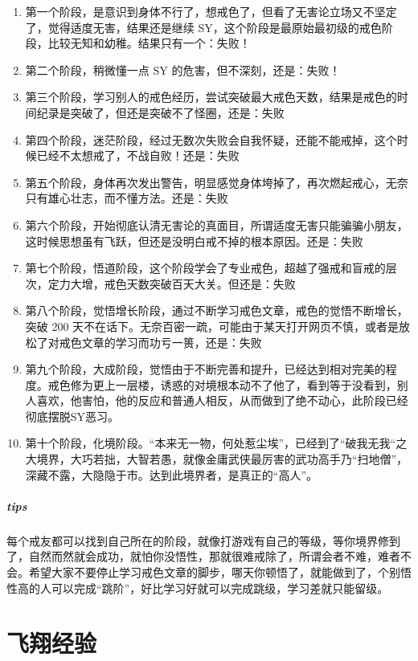 \documentclass[fontset=founder]{ctexart}
\begin{document}
\begin{enumerate}
    \item 第一个阶段，是意识到身体不行了，想戒色了，但看了无害论立场又不坚定了，觉得适度无害，结果还是继续 SY，这个阶段是最原始最初级的戒色阶段，比较无知和幼稚。结果只有一个：失败！
    \item 第二个阶段，稍微懂一点 SY 的危害，但不深刻，还是：失败！
    \item 第三个阶段，学习别人的戒色经历，尝试突破最大戒色天数，结果是戒色的时间纪录是突破了，但还是突破不了怪圈，还是：失败
    \item 第四个阶段，迷茫阶段，经过无数次失败会自我怀疑，还能不能戒掉，这个时候已经不太想戒了，不战自败！还是：失败
    \item 第五个阶段，身体再次发出警告，明显感觉身体垮掉了，再次燃起戒心，无奈只有雄心壮志，而不懂方法。还是：失败
    \item 第六个阶段，开始彻底认清无害论的真面目，所谓适度无害只能骗骗小朋友，这时候思想虽有飞跃，但还是没明白戒不掉的根本原因。还是：失败
    \item 第七个阶段，悟道阶段，这个阶段学会了专业戒色，超越了强戒和盲戒的层次，定力大增，戒色天数突破百天大关。但还是：失败
    \item 第八个阶段，觉悟增长阶段，通过不断学习戒色文章，戒色的觉悟不断增长，突破 200 天不在话下。无奈百密一疏，可能由于某天打开网页不慎，或者是放松了对戒色文章的学习而功亏一篑，还是：失败
    \item 第九个阶段，大成阶段，觉悟由于不断完善和提升，已经达到相对完美的程度。戒色修为更上一层楼，诱惑的对境根本动不了他了，看到等于没看到，别人喜欢，他害怕，他的反应和普通人相反，从而做到了绝不动心，此阶段已经彻底摆脱SY恶习。
    \item 第十个阶段，化境阶段。“本来无一物，何处惹尘埃”，已经到了“破我无我“之大境界，大巧若拙，大智若愚，就像金庸武侠最厉害的武功高手乃“扫地僧”，深藏不露，大隐隐于市。达到此境界者，是真正的“高人”。
\end{enumerate}

\subparagraph{tips} 每个戒友都可以找到自己所在的阶段，就像打游戏有自己的等级，等你境界修到了，自然而然就会成功，就怕你没悟性，那就很难戒除了，所谓会者不难，难者不会。希望大家不要停止学习戒色文章的脚步，哪天你顿悟了，就能做到了，个别悟性高的人可以完成“跳阶”，好比学习好就可以完成跳级，学习差就只能留级。

\section{飞翔经验}
\end{document}

